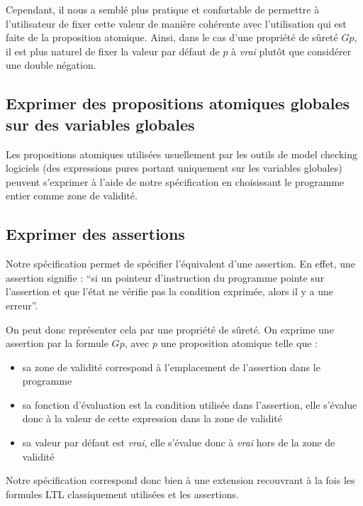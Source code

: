 Cependant, il nous a semblé plus pratique et confortable de permettre à
l'utilisateur de fixer cette valeur de manière cohérente avec
l'utilisation qui est faite de la proposition atomique. Ainsi, dans le
cas d'une propriété de sûreté \(G p\), il est plus naturel de fixer la
valeur par défaut de \(p\) à \emph{vrai} plutôt que considérer une
double négation.

\subsection{Exprimer des propositions atomiques globales sur des
variables globales}

Les propositions atomiques utilisées usuellement par les outils de model
checking logiciels (des expressions pures portant uniquement sur les
variables globales) peuvent s'exprimer à l'aide de notre spécification
en choisissant le programme entier comme zone de validité.

\subsection{Exprimer des assertions}

Notre spécification permet de spécifier l'équivalent d'une assertion. En
effet, une assertion signifie : ``si un pointeur d'instruction du
programme pointe sur l'assertion et que l'état ne vérifie pas la
condition exprimée, alors il y a une erreur''.

On peut donc représenter cela par une propriété de sûreté. On exprime
une assertion par la formule \(G p\), avec \(p\) une proposition
atomique telle que :

\begin{itemize}
\item
  sa zone de validité correspond à l'emplacement de l'assertion dans le
  programme
\item
  sa fonction d'évaluation est la condition utilisée dans l'assertion,
  elle s'évalue donc à la valeur de cette expression dans la zone de
  validité
\item
  sa valeur par défaut est \emph{vrai}, elle s'évalue donc à \emph{vrai}
  hors de la zone de validité
\end{itemize}

Notre spécification correspond donc bien à une extension recouvrant à la
fois les formules LTL classiquement utilisées et les assertions.